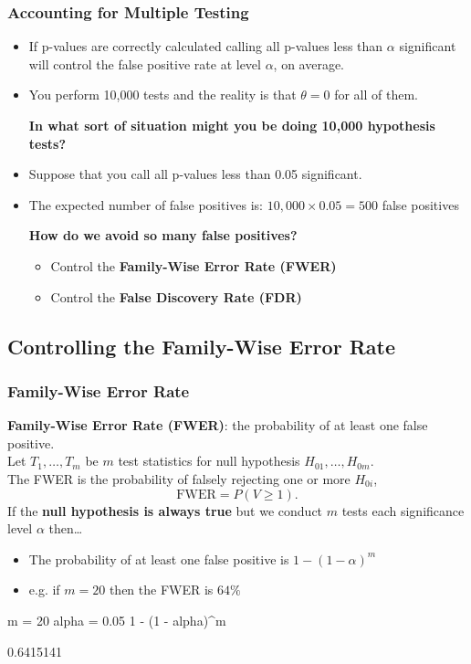 \documentclass[a4paper]{article}\usepackage[]{graphicx}\usepackage[]{xcolor}
\begin{document}
\subsubsection{Accounting for Multiple Testing}
\begin{itemize}
	\item If p-values  are correctly calculated calling all p-values less than \( \alpha \) significant will control the false positive rate at level \( \alpha \), on average.
	\item You perform 10,000 tests and the reality is that \( \theta = 0 \) for all of them.
	\begin{greenbox}
		\textbf{In what sort of situation might you be doing 10,000 hypothesis tests?}
	\end{greenbox}
	\item Suppose that you call all p-values less than 0.05 significant.
	\item The expected number of false positives is: \( 10,000 \times 0.05 = 500 \) false positives 
	\begin{greenbox}
		\textbf{How do we avoid so many false positives?}
		\begin{itemize}
			\item Control the \textcolor{mygreen}{\textbf{Family-Wise Error Rate (FWER)}}
			\item Control the \textcolor{myred}{\textbf{False Discovery Rate (FDR)}}
		\end{itemize}
	\end{greenbox}
\end{itemize}
\subsection{Controlling the Family-Wise Error Rate}
\subsubsection{Family-Wise Error Rate}
\textcolor{myred}{\textbf{Family-Wise Error Rate (FWER)}}: the probability of at least one false positive.\\
Let \( T_1,\dotsc,T_m \) be \( m \) test statistics for null hypothesis \( H_{01},\dotsc,H_{0m} \).\\
The FWER is the probability of falsely rejecting one or more \( H_{0i} \),
\[
	\mathrm{FWER} = P(V \geq 1).
\]
If the \textbf{null hypothesis is always true} but we conduct \( m \) tests each significance level \( \alpha \) then\dots
\begin{itemize}
	\item The probability of at least one false positive is \( 1 - (1 - \alpha)^m \)
	\item e.g. if \( m = 20 \) then the FWER is \( 64\% \) 
\end{itemize}
\begin{Schunk}
\begin{Sinput}
m = 20
alpha = 0.05
1 - (1 - alpha)^m
\end{Sinput}
\begin{Soutput}
[1] 0.6415141
\end{Soutput}
\end{Schunk}
\end{document}
